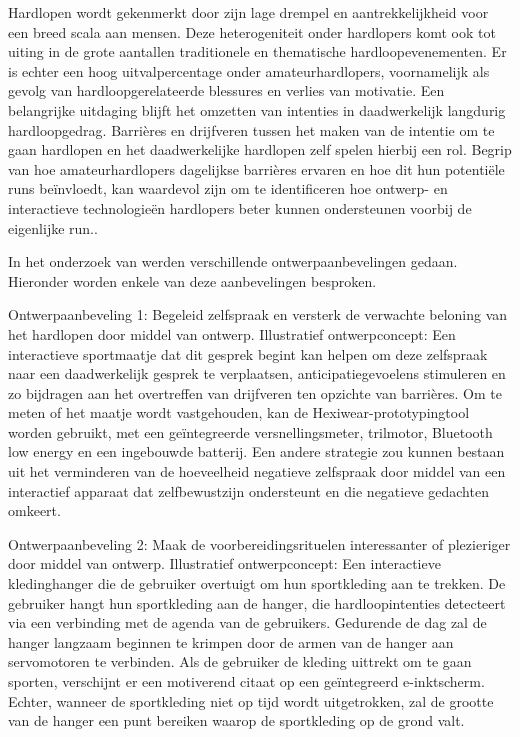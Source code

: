     Hardlopen wordt gekenmerkt door zijn lage drempel en aantrekkelijkheid voor een breed scala aan mensen. 
    Deze heterogeniteit onder hardlopers komt ook tot uiting in de grote aantallen traditionele en thematische hardloopevenementen. 
    Er is echter een hoog uitvalpercentage onder amateurhardlopers, voornamelijk als gevolg van hardloopgerelateerde blessures en verlies van motivatie. 
    Een belangrijke uitdaging blijft het omzetten van intenties in daadwerkelijk langdurig hardloopgedrag. 
    Barrières en drijfveren tussen het maken van de intentie om te gaan hardlopen en het daadwerkelijke hardlopen zelf spelen hierbij een rol. 
    Begrip van hoe amateurhardlopers dagelijkse barrières ervaren en hoe dit hun potentiële runs beïnvloedt, kan waardevol zijn 
    om te identificeren hoe ontwerp- en interactieve technologieën hardlopers beter kunnen ondersteunen voorbij de eigenlijke run.\textcite{Menheere2020}.


    In het onderzoek van \textcite{Menheere2020} werden verschillende ontwerpaanbevelingen gedaan. Hieronder worden enkele van deze aanbevelingen besproken.


    Ontwerpaanbeveling 1: Begeleid zelfspraak en versterk de verwachte beloning van het hardlopen door middel van ontwerp. 
    Illustratief ontwerpconcept: Een interactieve sportmaatje dat dit gesprek begint kan helpen om deze zelfspraak naar een daadwerkelijk gesprek te verplaatsen, 
    anticipatiegevoelens stimuleren en zo bijdragen aan het overtreffen van drijfveren ten opzichte van barrières. 
    Om te meten of het maatje wordt vastgehouden, kan de Hexiwear-prototypingtool worden gebruikt, met een geïntegreerde versnellingsmeter, 
    trilmotor, Bluetooth low energy en een ingebouwde batterij. Een andere strategie zou kunnen bestaan uit het verminderen van de hoeveelheid 
    negatieve zelfspraak door middel van een interactief apparaat dat zelfbewustzijn ondersteunt en die negatieve gedachten omkeert.


    Ontwerpaanbeveling 2: Maak de voorbereidingsrituelen interessanter of plezieriger door middel van ontwerp. 
    Illustratief ontwerpconcept: Een interactieve kledinghanger die de gebruiker overtuigt om hun sportkleding aan te trekken. 
    De gebruiker hangt hun sportkleding aan de hanger, die hardloopintenties detecteert via een verbinding met de agenda van de gebruikers. 
    Gedurende de dag zal de hanger langzaam beginnen te krimpen door de armen van de hanger aan servomotoren te verbinden. 
    Als de gebruiker de kleding uittrekt om te gaan sporten, verschijnt er een motiverend citaat op een geïntegreerd e-inktscherm. 
    Echter, wanneer de sportkleding niet op tijd wordt uitgetrokken, zal de grootte van de hanger een punt bereiken waarop de sportkleding op de grond valt.



